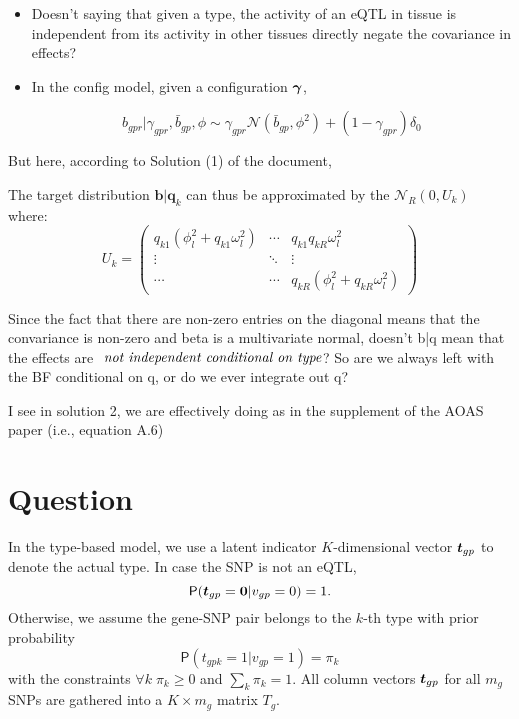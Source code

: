 \documentclass[10pt]{article}
\newcommand{\Prd}{\mathsf{P}} %
\newcommand{\Norm}{{\mathcal{N}}} %
\newcommand{\tv}{\mbox{\boldmath$t$}}
\newcommand{\gav}{\mbox{\boldmath$\gamma$}}
\begin{document}
\begin{itemize}

\item Doesn't saying that given a type, the activity of an eQTL in tissue is independent from its activity in other tissues directly negate the covariance in effects?

\item In the config model, given a configuration $\gav$, 

\begin{equation}
  b_{gpr} | \gamma_{gpr}, \bar{b}_{gp}, \phi \sim \gamma_{gpr} \Norm(\bar{b}_{gp}, \phi^2) + (1 - \gamma_{gpr}) \delta_0
\end{equation}

\end{itemize}

But here, according to Solution (1) of the document, 

The target distribution $\bm{b} | \bm{q}_k$ can thus be approximated by the $\Norm_R(0,U_k)$ where:
\[
U_k = 
\begin{pmatrix}
  q_{k1} (\phi_l^2 + q_{k1} \omega_l^2) & \cdots & q_{k1} q_{kR} \omega_l^2 \\
  \vdots & \ddots & \vdots \\
  \cdots & \cdots & q_{kR} (\phi_l^2 + q_{kR} \omega_l^2)
\end{pmatrix}
\]

Since the fact that there are non-zero entries on the diagonal means that the convariance is non-zero and beta is a multivariate normal, doesn't b|q mean that the effects are $\emph{ not independent conditional on type}$? So are we always left with the BF conditional on q, or do we ever integrate out q?

I see in solution 2, we are effectively doing as in the supplement of the AOAS paper (i.e., equation A.6)





\section{Question}


In the type-based model, we use a latent indicator $K$-dimensional vector $\tv_{gp}$ to denote the actual type.
In case the SNP is not an eQTL,
\begin{equation}
  \Prd(\tv_{gp} = \bm{0}  | v_{gp} = 0) = 1.
\end{equation}
Otherwise, we assume the gene-SNP pair belongs to the $k$-th type with prior probability
\begin{equation}
  \Prd(t_{gpk} = 1 | v_{gp} = 1) = \pi_k
\end{equation}
with the constraints $\forall k \; \pi_k \ge 0$ and $\sum_k \pi_k = 1$.
All column vectors $\tv_{gp}$ for all $m_g$ SNPs are gathered into a $K \times m_g$ matrix $T_g$.
\end{document}

